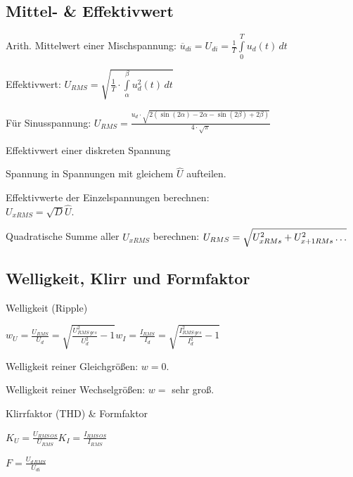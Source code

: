 \documentclass[german]{latex4ei/latex4ei_sheet}
\begin{document}
	\subsection{Mittel- \& Effektivwert}
	\begin{sectionbox}
		\begin{symbolbox}
			\item Arith. Mittelwert einer Mischspannung: $\overline{u}_{di} = U_{di} = \frac{1}{T}\int\limits_0^T u_d(t)\,dt$
			\item Effektivwert: $U_{RMS} = \sqrt{\frac{1}{T}\cdot \int\limits_{\alpha}^\beta u^2_d(t)\,dt}$
			\item Für Sinusspannung: $U_{RMS} = \frac{u_d \cdot \sqrt{2(\sin(2\alpha)-2\alpha - \sin(2\beta)+2\beta)}}{4\cdot\sqrt{\pi}}$
		\end{symbolbox}
		\begin{cookbox}{Effektivwert einer diskreten Spannung}
			\item Spannung in Spannungen mit gleichem $\hat{U}$ aufteilen.
			\item Effektivwerte der Einzelspannungen berechnen:\\ $U_{xRMS} = \sqrt{D} \hat{U}$.
			\item Quadratische Summe aller $U_{xRMS}$ berechnen: $\\ U_{RMS} = \sqrt{U_{xRMs}^2+U_{x+1RMs}^2\dots}$
		\end{cookbox}
	\subsection{Welligkeit, Klirr und Formfaktor}
		\begin{symbolbox}{Welligkeit (Ripple)}
			\item $w_U = \frac{U_{RMS}}{U_d} = \sqrt{\frac{U_{RMS\,ges}^2}{U_d^2}-1}$\qquad $w_I = \frac{I_{RMS}}{I_d} = \sqrt{\frac{I_{RMS\,ges}^2}{I_d^2}-1}$
			\item Welligkeit reiner Gleichgrößen: $w = 0$.
			\item Welligkeit reiner Wechselgrößen: $w =$ sehr groß.
		\end{symbolbox}
		\begin{bluebox}{Klirrfaktor (THD) \& Formfaktor }
			\item $K_U =   \frac{U_{RMS\, OS}}{U_{RMS}}$\qquad $K_I =   \frac{I_{RMS\, OS}}{I_{RMS}}$
			\item \item $F = \frac{U_{d\,RMS}}{U_{di}}$
		\end{bluebox}

\end{sectionbox}
\end{document}

